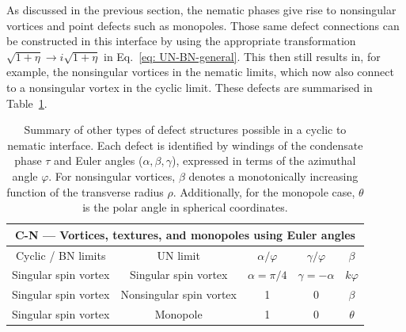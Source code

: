 As discussed in the previous section, the nematic phases give rise to
nonsingular vortices and point defects such as monopoles.
Those same defect connections can be constructed in this interface by using
the appropriate transformation \(\sqrt{1+\eta} \rightarrow i\sqrt{1+\eta}\) in
Eq.~\eqref{eq: UN-BN-general}.
This then still results in, for example, the nonsingular vortices in the
nematic limits, which now also connect to a nonsingular vortex in the cyclic
limit.
These defects are summarised in Table~\ref{tab: C-N-other}.
\begin{table}
    \centering
    \begin{tabular}{ccccc}
        \toprule
        \multicolumn{5}{c}{C-N --- Vortices, textures, and monopoles using Euler
            angles} \\
        \midrule
        Cyclic / BN limits & UN limit & \(\alpha/\varphi \)
        & \(\gamma/\varphi \) & \(\beta \) \\
        \midrule
        Singular spin vortex & Singular spin vortex & \(\alpha=\pi/4\)
            & \(\gamma=-\alpha\) & \(k\varphi\) \\
        Singular spin vortex & Nonsingular spin vortex & 1 & 0
            & \(\beta\) \\
        Singular spin vortex & Monopole & 1 & 0 & \(\theta\) \\
        \bottomrule
    \end{tabular}
    \caption[Examples of monopole and nonsingular vortex connections across a
    cyclic to nematic interface]{\label{tab: C-N-other}Summary of other types of
    defect structures possible in a cyclic to nematic interface.
    Each defect is identified by windings of the condensate phase \(\tau \) and
    Euler angles (\(\alpha, \beta, \gamma \)), expressed in terms of the
    azimuthal angle \(\varphi \).
    For nonsingular vortices, \(\beta\) denotes a monotonically increasing
    function of the transverse radius \(\rho \).
    Additionally, for the monopole case, \(\theta \) is the polar angle in
    spherical coordinates.}
\end{table}


